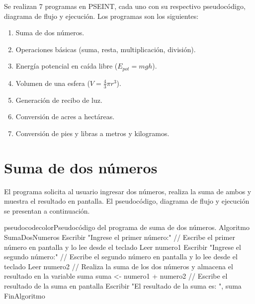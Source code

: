 Se realizan 7 programas en PSEINT, cada uno con su respectivo pseudocódigo, diagrama de flujo y ejecución. Los programas son los siguientes:
\begin{enumerate}
	\item Suma de dos números.
	\item Operaciones básicas (suma, resta, multiplicación, división).
	\item Energía potencial en caída libre ($E_{pot} = mgh$).
	\item Volumen de una esfera ($V = \frac{4}{3}\pi r^3$).
	\item Generación de recibo de luz.
	\item Conversión de acres a hectáreas.
	\item Conversión de pies y libras a metros y kilogramos.
\end{enumerate}


\section{Suma de dos números}

El programa solicita al usuario ingresar dos números, realiza la suma de ambos y muestra el resultado en pantalla. El pseudocódigo, diagrama de flujo y ejecución se presentan a continuación.		
	
\begin{sourcecode}{pseudocodecolor}{Pseudocódigo del programa de suma de dos números.}
Algoritmo SumaDosNumeros
    Escribir "Ingrese el primer número:"
    // Escribe el primer número en pantalla y lo lee desde el teclado
    Leer numero1
    Escribir "Ingrese el segundo número:"
    // Escribe el segundo número en pantalla y lo lee desde el teclado
    Leer numero2
    // Realiza la suma de los dos números y almacena el resultado en la variable suma
    suma <- numero1 + numero2
    // Escribe el resultado de la suma en pantalla
    Escribir "El resultado de la suma es: ", suma
FinAlgoritmo
\end{sourcecode}



